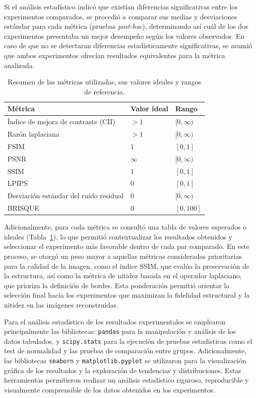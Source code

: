 Si el análisis estadístico indicó que existían diferencias significativas entre los experimentos comparados, se procedió a comparar sus medias y desviaciones estándar para cada métrica (pruebas \textit{post-hoc}), determinando así cuál de los dos experimentos presentaba un mejor desempeño según los valores observados. En caso de que no se detectaran diferencias estadísticamente significativas, se asumió que ambos experimentos ofrecían resultados equivalentes para la métrica analizada.

\begin{table}[h]
    \centering
    \caption{Resumen de las métricas utilizadas, sus valores ideales y rangos de referencia.}
    \label{tab:metrics-expected-values}
    \begin{tabular}{>{\raggedright}p{5cm}p{3cm}p{3cm}}
        \toprule
        \textbf{Métrica} & \textbf{Valor ideal} & \textbf{Rango} \\
        \midrule
        Índice de mejora de contraste (CII) & $>1$ & $[0, \infty)$ \\
        Razón laplaciana & $>1$ & $[0, \infty)$ \\
        FSIM & $1$ & $[0, 1]$ \\
        PSNR & $\infty$ & $[0, \infty)$ \\
        SSIM & $1$ & $[0, 1]$ \\
        LPIPS & $0$ & $[0, 1]$ \\
        Desviación estándar del ruido residual & $0$ & $[0, \infty)$ \\
        BRISQUE & $0$ & $[0, 100]$ \\
        \bottomrule
    \end{tabular}
\end{table}

Adicionalmente, para cada métrica se consultó una tabla de valores esperados o ideales (Tabla~\ref{tab:metrics-expected-values}), lo que permitió contextualizar los resultados obtenidos y seleccionar el experimento más favorable dentro de cada par comparado. En este proceso, se otorgó un peso mayor a aquellas métricas consideradas prioritarias para la calidad de la imagen, como el índice SSIM, que evalúa la preservación de la estructura, así como la métrica de nitidez basada en el operador laplaciano, que prioriza la definición de bordes. Esta ponderación permitió orientar la selección final hacia los experimentos que maximizan la fidelidad estructural y la nitidez en las imágenes reconstruidas.

Para el análisis estadístico de los resultados experimentales se emplearon principalmente las bibliotecas: \texttt{pandas} \cite{pandas} para la manipulación y análisis de los datos tabulados, y \texttt{scipy.stats} \cite{2020SciPy-Nature} para la ejecución de pruebas estadísticas como el test de normalidad y las pruebas de comparación entre grupos. Adicionalmente, las bibliotecas \texttt{seaborn} \cite{seaborn} y \texttt{matplotlib.pyplot} \cite{matplotlib} se utilizaron para la visualización gráfica de los resultados y la exploración de tendencias y distribuciones. Estas herramientas permitieron realizar un análisis estadístico riguroso, reproducible y visualmente comprensible de los datos obtenidos en los experimentos.
